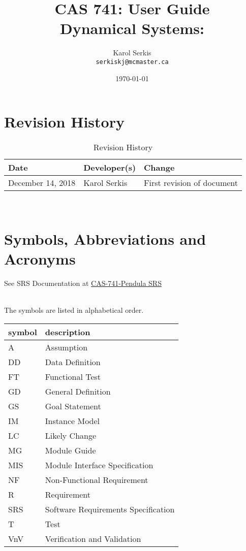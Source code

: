 \documentclass[12pt, titlepage]{article}
\begin{document}
\title{CAS 741: User Guide\\[10pt]
\Large Dynamical Systems: \progname}
\author{Karol Serkis\\\texttt{serkiskj@mcmaster.ca}}

\date{\today}
	
\maketitle


\section{Revision History}

\begin{table}[hp]
\caption{Revision History} \label{TblRevisionHistory}
\begin{tabularx}{\textwidth}{llX}
\toprule
\textbf{Date} & \textbf{Developer(s)} & \textbf{Change}\\
\midrule
December 14, 2018 & Karol Serkis & First revision of document\\
\bottomrule
\end{tabularx}
\end{table}

~\newpage

\section{Symbols, Abbreviations and Acronyms}

See SRS Documentation at 
\href{https://github.com/karolserkis/CAS-741-Pendula
/blob/master/docs/SRS/SRS.pdf}{CAS-741-Pendula SRS}

\\
The symbols are listed in alphabetical order.\\

\renewcommand{\arraystretch}{1.2}
\begin{tabular}{l l} 
  \toprule		
  \textbf{symbol} & \textbf{description}\\
  \midrule 
  A & Assumption\\
  DD & Data Definition\\
  FT & Functional Test \\
  GD & General Definition\\
  GS & Goal Statement\\
  IM & Instance Model\\
  LC & Likely Change\\
  MG & Module Guide\\ 
  MIS & Module Interface Specification\\ 
  NF & Non-Functional Requirement\\
  R & Requirement\\
  SRS & Software Requirements Specification\\
  T & Test\\
  VnV & Verification and Validation\\ 
  \bottomrule
\end{tabular}\\
\end{document}
